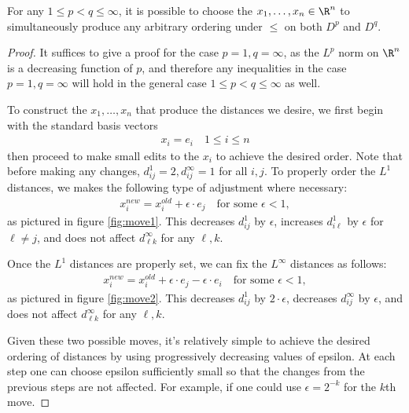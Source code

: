 \documentclass[journal]{IEEEtran}
\begin{document}
\begin{theorem} For any $1 \leq p < q \leq \infty$, it is possible to choose the $x_1,\ldots,x_n \in \R^n$ to simultaneously produce any arbitrary ordering under $\leq$ on both $D^p$ and $D^q$.
\end{theorem}
\begin{proof}
  It suffices to give a proof for the case $p=1, q=\infty$, as the $L^p$ norm on $\R^n$ is a decreasing function of $p$, and therefore any inequalities in the case $p = 1, q = \infty$ will hold in the general case $1 \leq p < q \leq \infty$ as well.

  To construct the $x_1,\ldots,x_n$ that produce the distances we desire, we first begin with the standard basis vectors
  \begin{align}
  x_i = e_i \quad 1\leq i \leq n
  \end{align}
  then proceed to make small edits to the $x_i$ to achieve the desired order. Note that before making any changes, $d_{ij}^1 = 2, d_{ij}^\infty = 1$ for all $i,j$. To properly order the $L^1$ distances, we makes the following type of adjustment where necessary:
  \begin{align}\label{eqn:move1}
    x_i^{new} = x_i^{old} + \epsilon\cdot e_j\quad\text{for some }\epsilon < 1,
  \end{align}
  as pictured in figure \ref{fig:move1}. This decreases $d_{ij}^1$ by $\epsilon$, increases $d_{i\ell}^1$ by $\epsilon$ for $\ell \neq j$, and does not affect $d_{\ell k}^\infty$ for any $\ell, k$.

  Once the $L^1$ distances are properly set, we can fix the $L^\infty$ distances as follows:
  \begin{align}\label{eqn:move2}
    x_i^{new} = x_i^{old} + \epsilon\cdot e_j - \epsilon\cdot e_i \quad\text{for some }\epsilon < 1,
  \end{align}
  as pictured in figure \ref{fig:move2}. This decreases $d_{ij}^1$ by $2\cdot\epsilon$, decreases $d_{ij}^\infty$ by $\epsilon$, and does not affect $d_{\ell k}^\infty$ for any $\ell, k$.

  Given these two possible moves, it's relatively simple to achieve the desired ordering of distances by using progressively decreasing values of epsilon. At each step one can choose epsilon sufficiently small so that the changes from the previous steps are not affected. For example, if one could use $\epsilon = 2^{-k}$ for the $k$th move.
  

\end{proof}
\end{document}
